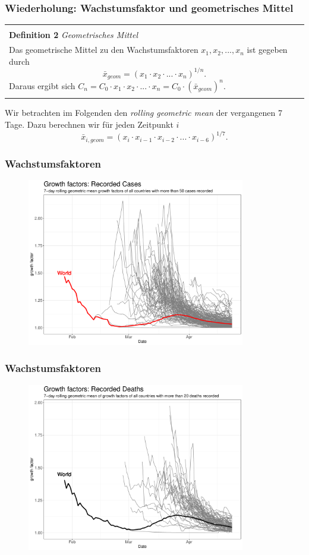 \documentclass{beamer}
\newenvironment{boxeded}
    {\begin{center}
    \begin{tabular}{|p{0.9\textwidth}|}
    \hline\\
    }
    { 
    \\\\\hline
    \end{tabular} 
    \end{center}
    }
\begin{document}
\begin{frame}
\frametitle{Wiederholung: Wachstumsfaktor und geometrisches Mittel}
	\begin{boxeded}
	\textbf{Definition 2} \textit{Geometrisches Mittel}\\
	Das geometrische Mittel zu den Wachstumsfaktoren $x_1, x_2, ..., x_n$ ist gegeben durch $$\bar{x}_{geom} = (x_1 \cdot x_2 \cdot ... \cdot x_n)^{1/n}.$$ Daraus ergibt sich $C_n = C_0 \cdot x_1 \cdot x_2 \cdot ... \cdot x_n = C_0 \cdot (\bar{x}_{geom})^n$.
	\end{boxeded}
	\pause
	Wir betrachten im Folgenden den \emph{rolling geometric mean} der vergangenen 7 Tage. Dazu berechnen wir für jeden Zeitpunkt $i$ $$\bar{x}_{i, geom} = (x_i \cdot x_{i-1} \cdot x_{i-2} \cdot ... \cdot x_{i-6})^{1/7}.$$


\end{frame}

\begin{frame}
\frametitle{Wachstumsfaktoren}
	\begin{figure}
		\centering
		\includegraphics[width = 270pt]{GF_confirmed}
	\end{figure}
\end{frame}

\begin{frame}
\frametitle{Wachstumsfaktoren}
	\begin{figure}
		\centering
		\includegraphics[width = 270pt]{GF_deaths}
	\end{figure}
\end{frame}
\end{document}

